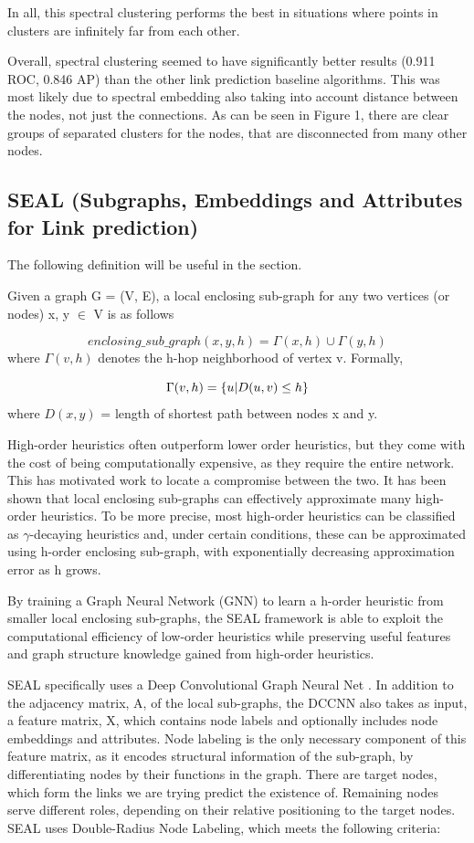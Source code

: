 \documentclass[10pt,twocolumn,letterpaper]{article}
\begin{document}
In all, this spectral clustering performs the best in situations where points in clusters are infinitely far from each other. \cite{Ng01onspectral}

Overall, spectral clustering seemed to have significantly better results (0.911 ROC, 0.846 AP) than the other link prediction baseline algorithms. This was most likely due to spectral embedding also taking into account distance between the nodes, not just the connections. As can be seen in Figure 1, there are clear groups of separated clusters for the nodes, that are disconnected from many other nodes. 

\subsection{SEAL (Subgraphs, Embeddings and Attributes for Link prediction)}
The following definition will be useful in the section.

Given a graph G  = (V, E), a local enclosing sub-graph for any two vertices (or nodes) x, y $\in$ V is as follows

\[
enclosing\_sub\_graph(x, y, h) = \Gamma(x, h) \cup \Gamma(y, h)
\]
where $\Gamma(v, h)$ denotes the h-hop neighborhood of vertex v. Formally,

\[
\Gamma(v, h) = \{u\space|\space D(u, v) \leq h\}
\] where $D(x, y)$ = length of shortest path between nodes x and y.

High-order heuristics often outperform lower order heuristics, but they come with the cost of being computationally expensive, as they require the entire network. This has motivated work to locate a compromise between the two. It has been shown that local enclosing sub-graphs can effectively approximate many high-order heuristics. To be more precise, most high-order heuristics can be classified as $\gamma$-decaying heuristics and, under certain conditions, these can be approximated using h-order enclosing sub-graph, with exponentially decreasing approximation error as h grows.

By training a Graph Neural Network (GNN) to learn a h-order heuristic from smaller local enclosing sub-graphs, the SEAL framework\cite{SEAL} is able to exploit the computational efficiency of low-order heuristics while preserving useful features and graph structure knowledge gained from high-order heuristics.

SEAL specifically uses a Deep Convolutional Graph Neural Net \cite{DGCNN}. In addition to the adjacency matrix, A, of the local sub-graphs, the DCCNN also takes as input, a feature matrix, X, which contains node labels and optionally includes node embeddings and attributes. 
Node labeling is the only necessary component of this feature matrix, as it encodes structural information of the sub-graph, by differentiating nodes by their functions in the graph. There are target nodes, which form the links we are trying predict the existence of. Remaining nodes serve different roles, depending on their relative positioning to the target nodes. SEAL uses Double-Radius Node Labeling, which meets the following criteria:
\end{document}
